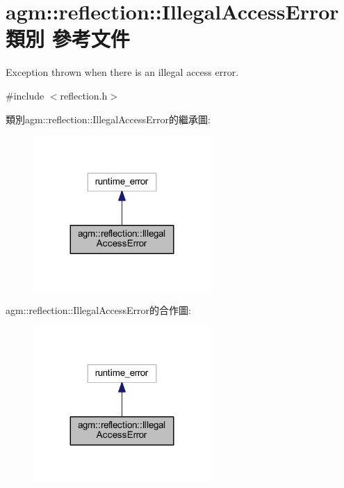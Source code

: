 \hypertarget{classagm_1_1reflection_1_1_illegal_access_error}{}\section{agm\+:\+:reflection\+:\+:Illegal\+Access\+Error 類別 參考文件}
\label{classagm_1_1reflection_1_1_illegal_access_error}


Exception thrown when there is an illegal access error.  




{\ttfamily \#include $<$reflection.\+h$>$}



類別agm\+:\+:reflection\+:\+:Illegal\+Access\+Error的繼承圖\+:\nopagebreak
\begin{figure}[H]
\begin{center}
\leavevmode
\includegraphics[width=191pt]{classagm_1_1reflection_1_1_illegal_access_error__inherit__graph}
\end{center}
\end{figure}


agm\+:\+:reflection\+:\+:Illegal\+Access\+Error的合作圖\+:\nopagebreak
\begin{figure}[H]
\begin{center}
\leavevmode
\includegraphics[width=191pt]{classagm_1_1reflection_1_1_illegal_access_error__coll__graph}
\end{center}
\end{figure}
